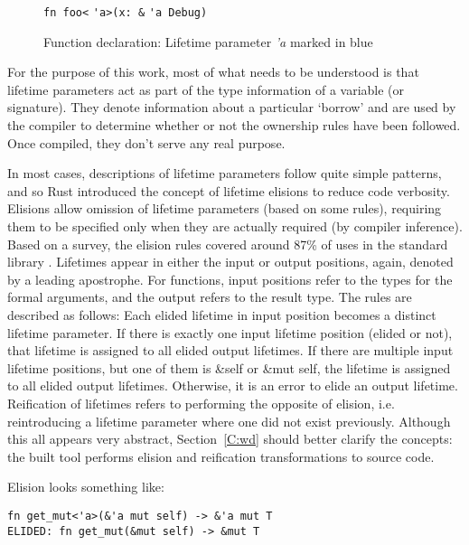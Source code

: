 \begin{figure}[h]
\centering
{\verb|fn foo<|}{\color{blue} \verb|'a|}{\verb|>(x: &|}
{\color{blue} \verb|'a|}{\verb| Debug)|}
\caption{Function declaration: Lifetime parameter \emph{'a} marked in blue}
\end{figure}

For the purpose of this work, most of what needs to be understood is that lifetime parameters act as part of the type information of a variable (or signature). They denote information about a particular `borrow' and are used by the compiler to determine whether or not the ownership rules have been followed. Once compiled, they don't serve any real purpose.

In most cases, descriptions of lifetime parameters follow quite simple patterns, and so Rust introduced the concept of lifetime elisions to reduce code verbosity. Elisions allow omission of lifetime parameters (based on some rules), requiring them to be specified only when they are actually required (by compiler inference). Based on a survey, the elision rules covered around 87\% of uses in the standard library \cite{elisionrules}. Lifetimes appear in either the input or output positions, again, denoted by a leading apostrophe. For functions, input positions refer to the types for the formal arguments, and the output refers to the result type. The rules are described as follows: Each elided lifetime in input position becomes a distinct lifetime parameter. If there is exactly one input lifetime position (elided or not), that lifetime is assigned to all elided output lifetimes. If there are multiple input lifetime positions, but one of them is \&self or \&mut self, the lifetime is assigned to all elided output lifetimes. Otherwise, it is an error to elide an output lifetime.  Reification of lifetimes refers to performing the opposite of elision, i.e. reintroducing a lifetime parameter where one did not exist previously. Although this all appears very abstract, Section~\ref{C:wd} should better clarify the concepts: the built tool performs elision and reification transformations to source code.

\vspace{5mm}
Elision looks something like:
\begin{verbatim}
fn get_mut<'a>(&'a mut self) -> &'a mut T
ELIDED: fn get_mut(&mut self) -> &mut T
\end{verbatim}

